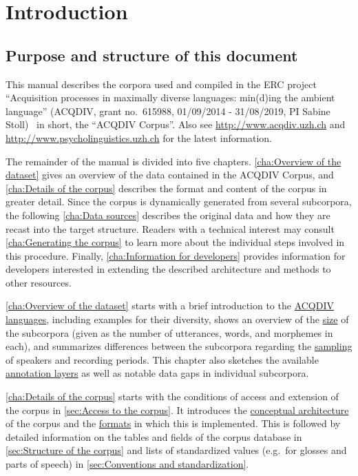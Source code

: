 \documentclass[a4paper, 11pt]{book}
\begin{document}
\tableofcontents
\listoffigures
\listoftables

\chapter{Introduction}

\section{Purpose and structure of this document}

This manual describes the corpora used and compiled in the ERC project “Acquisition processes in maximally diverse languages: min(d)ing the ambient language” (ACQDIV, grant no.\ 615988, 01/09/2014 - 31/08/2019, PI Sabine Stoll) \textendash\ in short, the “ACQDIV Corpus”. Also see \url{http://www.acqdiv.uzh.ch} and \url{http://www.psycholinguistics.uzh.ch} for the latest information. 

The remainder of the manual is divided into five chapters. \autoref{cha:Overview of the dataset} gives an overview of the data contained in the ACQDIV Corpus, and \autoref{cha:Details of the corpus} describes the format and content of the corpus in greater detail. Since the corpus is dynamically generated from several subcorpora, the following \autoref{cha:Data sources} describes the original data and how they are recast into the target structure. Readers with a technical interest may consult \autoref{cha:Generating the corpus} to learn more about the individual steps involved in this procedure. Finally, \autoref{cha:Information for developers} provides information for developers interested in extending the described architecture and methods to other resources.

\autoref{cha:Overview of the dataset} starts with a brief introduction to the \hyperref[sec:The language sample]{ACQDIV languages}, including examples for their diversity, shows an overview of the \hyperref[sec:Amount of data]{size} of the subcorpora (given as the number of utterances, words, and morphemes in each), and summarizes differences between the subcorpora regarding the \hyperref[sec:Sampling for speakers and periods]{sampling} of speakers and recording periods. This chapter also sketches the available \hyperref[sec:Annotation layers and data gaps]{annotation layers} as well as notable data gaps in individual subcorpora. 

\autoref{cha:Details of the corpus} starts with the conditions of access and extension of the corpus in \autoref{sec:Access to the corpus}. It introduces the \hyperref[sec:Architecture]{conceptual architecture} of the corpus and the \hyperref[sec:Format]{formats} in which this is implemented. This is followed by detailed information on the tables and fields of the corpus database in \autoref{sec:Structure of the corpus} and lists of standardized values (e.g.\ for glosses and parts of speech) in \autoref{sec:Conventions and standardization}. 
\end{document}
